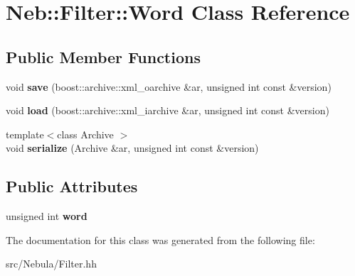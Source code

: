 \hypertarget{classNeb_1_1Filter_1_1Word}{\section{Neb\-:\-:Filter\-:\-:Word Class Reference}
\label{classNeb_1_1Filter_1_1Word}
}
\subsection*{Public Member Functions}
\begin{DoxyCompactItemize}
\item 
\hypertarget{classNeb_1_1Filter_1_1Word_a68ed4376e2575296ce033bcecfc1ba7c}{void {\bfseries save} (boost\-::archive\-::xml\-\_\-oarchive \&ar, unsigned int const \&version)}\label{classNeb_1_1Filter_1_1Word_a68ed4376e2575296ce033bcecfc1ba7c}

\item 
\hypertarget{classNeb_1_1Filter_1_1Word_a6f275867b6bf60faf934cff9ff3daadf}{void {\bfseries load} (boost\-::archive\-::xml\-\_\-iarchive \&ar, unsigned int const \&version)}\label{classNeb_1_1Filter_1_1Word_a6f275867b6bf60faf934cff9ff3daadf}

\item 
\hypertarget{classNeb_1_1Filter_1_1Word_a00a33a481c53a9280b9f8c4e408e8ad2}{{\footnotesize template$<$class Archive $>$ }\\void {\bfseries serialize} (Archive \&ar, unsigned int const \&version)}\label{classNeb_1_1Filter_1_1Word_a00a33a481c53a9280b9f8c4e408e8ad2}

\end{DoxyCompactItemize}
\subsection*{Public Attributes}
\begin{DoxyCompactItemize}
\item 
\hypertarget{classNeb_1_1Filter_1_1Word_a6ccc8350b1c59e2dcc3f81fec23f709c}{unsigned int {\bfseries word}}\label{classNeb_1_1Filter_1_1Word_a6ccc8350b1c59e2dcc3f81fec23f709c}

\end{DoxyCompactItemize}


The documentation for this class was generated from the following file\-:\begin{DoxyCompactItemize}
\item 
src/\-Nebula/Filter.\-hh\end{DoxyCompactItemize}
